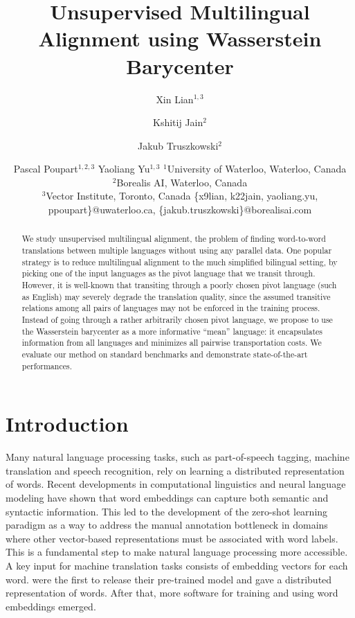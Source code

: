 \documentclass{article}
\title{Unsupervised Multilingual Alignment using Wasserstein Barycenter}
\author{
Xin Lian$^{1,3}$
\and
Kshitij Jain$^2$\and
Jakub Truszkowski$^{2}$ \and
Pascal Poupart$^{1,2,3}$ \And
Yaoliang Yu$^{1,3}$ 
\affiliations
$^1$University of Waterloo, Waterloo, Canada\\
$^2$Borealis AI, Waterloo, Canada\\
$^3$Vector Institute, Toronto, Canada
\emails
\{x9lian, k22jain, yaoliang.yu, ppoupart\}@uwaterloo.ca,
\{jakub.truszkowski\}@borealisai.com
}
\begin{document}
\maketitle

\begin{abstract}
We study unsupervised multilingual alignment, the problem of finding word-to-word translations between multiple languages without using any parallel data. One popular strategy is to reduce multilingual alignment to the much simplified bilingual setting, by picking one of the input languages as the pivot language that we transit through. However, it is well-known that transiting through a poorly chosen pivot language (such as English) may severely degrade the translation quality, since the assumed transitive relations among all pairs of languages may not be enforced in the training process. 
Instead of going through a rather arbitrarily chosen pivot language, we propose to use the Wasserstein barycenter as a more informative ``mean'' language: it encapsulates information from all languages and minimizes all pairwise transportation costs. 
We evaluate our method on standard benchmarks and demonstrate state-of-the-art performances.

\end{abstract}



\section{Introduction}


Many natural language processing tasks, such as part-of-speech tagging, machine translation and speech recognition, rely on learning a distributed representation of words. Recent developments in computational linguistics and neural language modeling have shown that word embeddings can capture both semantic and syntactic information. This led to the development of the zero-shot learning paradigm as a way to address the manual annotation bottleneck in domains where other vector-based representations must be associated with word labels.
This is a fundamental step to make natural language processing more accessible. 
A key input for machine translation tasks consists of embedding vectors for each word.
\citet{MikolovSCCD13} were the first to release their pre-trained model and gave a distributed representation of words. After that, more software for training and using word embeddings emerged.
\end{document}
